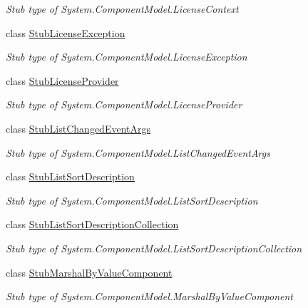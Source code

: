 \begin{DoxyCompactItemize}
\begin{DoxyCompactList}\small\item\em Stub type of System.\-Component\-Model.\-License\-Context\end{DoxyCompactList}\item 
class \hyperlink{class_system_1_1_component_model_1_1_fakes_1_1_stub_license_exception}{Stub\-License\-Exception}
\begin{DoxyCompactList}\small\item\em Stub type of System.\-Component\-Model.\-License\-Exception\end{DoxyCompactList}\item 
class \hyperlink{class_system_1_1_component_model_1_1_fakes_1_1_stub_license_provider}{Stub\-License\-Provider}
\begin{DoxyCompactList}\small\item\em Stub type of System.\-Component\-Model.\-License\-Provider\end{DoxyCompactList}\item 
class \hyperlink{class_system_1_1_component_model_1_1_fakes_1_1_stub_list_changed_event_args}{Stub\-List\-Changed\-Event\-Args}
\begin{DoxyCompactList}\small\item\em Stub type of System.\-Component\-Model.\-List\-Changed\-Event\-Args\end{DoxyCompactList}\item 
class \hyperlink{class_system_1_1_component_model_1_1_fakes_1_1_stub_list_sort_description}{Stub\-List\-Sort\-Description}
\begin{DoxyCompactList}\small\item\em Stub type of System.\-Component\-Model.\-List\-Sort\-Description\end{DoxyCompactList}\item 
class \hyperlink{class_system_1_1_component_model_1_1_fakes_1_1_stub_list_sort_description_collection}{Stub\-List\-Sort\-Description\-Collection}
\begin{DoxyCompactList}\small\item\em Stub type of System.\-Component\-Model.\-List\-Sort\-Description\-Collection\end{DoxyCompactList}\item 
class \hyperlink{class_system_1_1_component_model_1_1_fakes_1_1_stub_marshal_by_value_component}{Stub\-Marshal\-By\-Value\-Component}
\begin{DoxyCompactList}\small\item\em Stub type of System.\-Component\-Model.\-Marshal\-By\-Value\-Component\end{DoxyCompactList}\item 

\end{DoxyCompactItemize}
